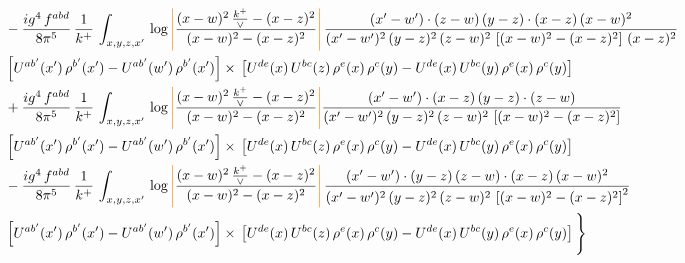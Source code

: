 \documentclass[9pt]{article}
\numberwithin{equation}{section}
\begin{document}
\begin{align}
& - \frac{ig^{4}\, f^{abd}}{8\pi^{5}}\, \frac{1}{k^{+}}\, \int_{x,y,z,x'}\,\log{\textcolor{orange}{\left|\textcolor{black}{\frac{(x-w)^{2}\,\frac{k^{+}}{\vee}-(x-z)^{2}}{(x-w)^{2}-(x-z)^{2}}}\right|}}\,\frac{(x'-w')\cdot (z-w)\, (y-z)\cdot (x-z)\, (x-w)^{2}}{(x'-w')^{2}\, (y-z)^{2}\, (z-w)^{2}\,\left[(x-w)^{2} - (x-z)^{2}\right]\, (x-z)^{2}}\, \notag \\ & \left[U^{ab'}(x')\,\rho^{b'}(x')-U^{ab'}(w')\, \rho^{b'}(x')\right]\times\,\left[U^{de}(x)\,U^{bc}(z)\, \rho^{e}(x)\,\rho^{c}(y)-U^{de}(x)\,U^{bc}(y)\,\rho^{e}(x)\,\rho^{c}(y)\right] \notag \\
& +\frac{ig^{4}\, f^{abd}}{8\pi^{5}}\, \frac{1}{k^{+}}\, \int_{x,y,z,x'}\,\log{\textcolor{orange}{\left|\textcolor{black}{\frac{(x-w)^{2}\,\frac{k^{+}}{\vee}-(x-z)^{2}}{(x-w)^{2}-(x-z)^{2}}}\right|}}\frac{(x'-w')\cdot (x-z)\, (y-z)\cdot (z-w)}{(x'-w')^{2}\, (y-z)^{2}\, (z-w)^{2}\,\left[(x-w)^{2} -(x-z)^{2}\right]}\, \notag \\ & \left[U^{ab'}(x')\,\rho^{b'}(x')-U^{ab'}(w')\, \rho^{b'}(x')\right]\times\,\left[U^{de}(x)\,U^{bc}(z)\, \rho^{e}(x)\,\rho^{c}(y)-U^{de}(x)\,U^{bc}(y)\,\rho^{e}(x)\,\rho^{c}(y)\right] \notag \\
& -\frac{ig^{4}\, f^{abd}}{8\pi^{5}}\, \frac{1}{k^{+}}\, \int_{x,y,z,x'}\,\log{\textcolor{orange}{\left|\textcolor{black}{\frac{(x-w)^{2}\,\frac{k^{+}}{\vee}-(x-z)^{2}}{(x-w)^{2}-(x-z)^{2}}}\right|}}\,\frac{(x'-w')\cdot (y-z)\, (z-w)\cdot (x-z)\,(x-w)^{2}}{(x'-w')^{2}\, (y-z)^{2}\, (z-w)^{2}\,\left[(x-w)^{2}-(x-z)^{2}\right]^{2}}\, \notag \\ & \left[U^{ab'}(x')\,\rho^{b'}(x')-U^{ab'}(w')\, \rho^{b'}(x')\right]\times\,\left[U^{de}(x)\,U^{bc}(z)\, \rho^{e}(x)\,\rho^{c}(y)-U^{de}(x)\,U^{bc}(y)\,\rho^{e}(x)\,\rho^{c}(y)\right]\Bigg\}
\end{align}
\end{document}
